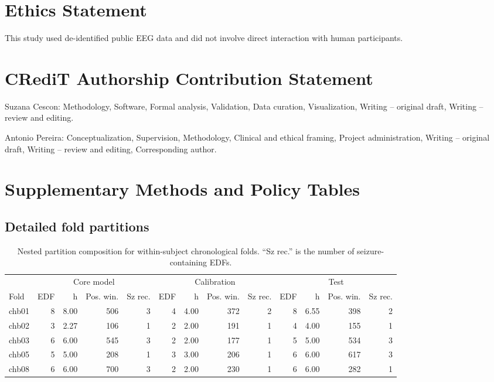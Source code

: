 \documentclass[11pt,a4paper]{article}
\begin{document}
\section*{Ethics Statement}

This study used de-identified public EEG data and did not involve direct interaction with human participants.

\section*{CRediT Authorship Contribution Statement}

Suzana Cescon: Methodology, Software, Formal analysis, Validation, Data curation, Visualization, Writing -- original draft, Writing -- review and editing.

Antonio Pereira: Conceptualization, Supervision, Methodology, Clinical and ethical framing, Project administration, Writing -- original draft, Writing -- review and editing, Corresponding author.

\appendix

\section{Supplementary Methods and Policy Tables}

\subsection{Detailed fold partitions}

\begin{table}[H]
\centering
\caption{Nested partition composition for within-subject chronological folds. ``Sz rec.'' is the number of seizure-containing EDFs.}
\label{tab:partition_audit}
\scriptsize
\setlength{\tabcolsep}{3.5pt}
\renewcommand{\arraystretch}{1.12}
\begin{tabular}{lrrrrrrrrrrrr}
\toprule
& \multicolumn{4}{c}{Core model} & \multicolumn{4}{c}{Calibration} & \multicolumn{4}{c}{Test} \\
\cmidrule(lr){2-5}\cmidrule(lr){6-9}\cmidrule(lr){10-13}
Fold & EDF & h & Pos. win. & Sz rec. & EDF & h & Pos. win. & Sz rec. & EDF & h & Pos. win. & Sz rec. \\
\midrule
chb01 & 8 & 8.00 & 506 & 3 & 4 & 4.00 & 372 & 2 & 8 & 6.55 & 398 & 2 \\
chb02 & 3 & 2.27 & 106 & 1 & 2 & 2.00 & 191 & 1 & 4 & 4.00 & 155 & 1 \\
chb03 & 6 & 6.00 & 545 & 3 & 2 & 2.00 & 177 & 1 & 5 & 5.00 & 534 & 3 \\
chb05 & 5 & 5.00 & 208 & 1 & 3 & 3.00 & 206 & 1 & 6 & 6.00 & 617 & 3 \\
chb08 & 6 & 6.00 & 700 & 3 & 2 & 2.00 & 230 & 1 & 6 & 6.00 & 282 & 1 \\
\bottomrule
\end{tabular}
\end{table}
\end{document}
